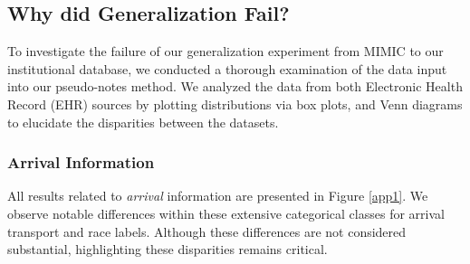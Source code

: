 \documentclass{article}
\theoremstyle{plain}
\theoremstyle{definition}
\theoremstyle{remark}
\begin{document}
\subsection{Why did Generalization Fail?}
\label{gener3}


To investigate the failure of our generalization experiment from MIMIC to our institutional database, we conducted a thorough examination of the data input into our pseudo-notes method. We analyzed the data from both Electronic Health Record (EHR) sources by plotting distributions via box plots, and Venn diagrams to elucidate the disparities between the datasets.

\subsubsection*{Arrival Information}

All results related to \textit{arrival} information are presented in Figure \ref{app1}. We observe notable differences within these extensive categorical classes for arrival transport and race labels. Although these differences are not considered substantial, highlighting these disparities remains critical.
\end{document}
